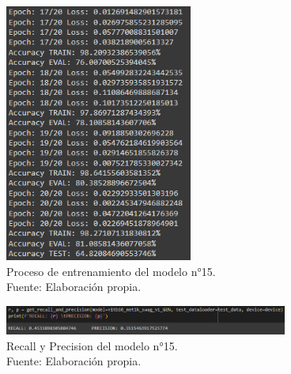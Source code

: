 \begin{figure}[H]
	\begin{center}
		\includegraphics[width=0.55\textwidth]{4/figures/model15_train.PNG}
		\caption[Proceso de entrenamiento del modelo n°15]{Proceso de entrenamiento del modelo n°15. \\
		Fuente: Elaboración propia.}
		\label{4:fig148}
	\end{center}
\end{figure}

\begin{figure}[H]
	\begin{center}
		\includegraphics[width=0.83\textwidth]{4/figures/model15_rp.PNG}
		\caption[Recall y Precision del modelo n°15]{Recall y Precision del modelo n°15. \\
		Fuente: Elaboración propia.}
		\label{4:fig149}
	\end{center}
\end{figure}

